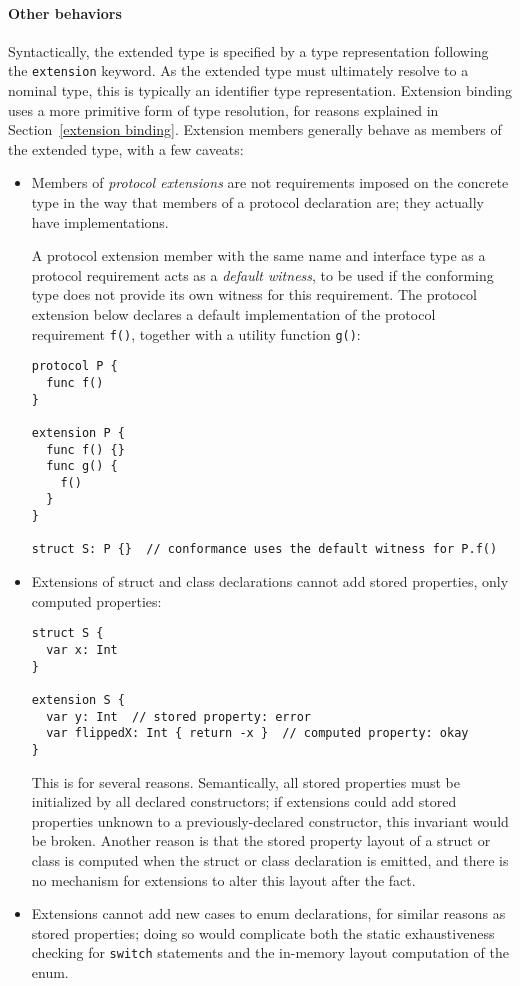 \documentclass[../generics]{subfiles}
\begin{document}
\paragraph{Other behaviors} Syntactically, the extended type is specified by a type representation following the \texttt{extension} keyword. As the extended type must ultimately resolve to a nominal type, this is typically an identifier type representation. Extension binding uses a more primitive form of type resolution, for reasons explained in Section~\ref{extension binding}.  Extension members generally behave as members of the extended type, with a few caveats:
\begin{itemize}
\item Members of \emph{protocol extensions} are not requirements imposed on the concrete type in the way that members of a protocol declaration are; they actually have implementations.

A protocol extension member with the same name and interface type as a protocol requirement acts as a \emph{default witness}, to be used if the conforming type does not provide its own witness for this requirement. The protocol extension below declares a default implementation of the protocol requirement \texttt{f()}, together with a utility function \texttt{g()}:
\begin{Verbatim}
protocol P {
  func f()
}

extension P {
  func f() {}
  func g() {
    f()
  }
}

struct S: P {}  // conformance uses the default witness for P.f()
\end{Verbatim}
\item Extensions of struct and class declarations cannot add stored properties, only computed properties:
\begin{Verbatim}
struct S {
  var x: Int
}

extension S {
  var y: Int  // stored property: error
  var flippedX: Int { return -x }  // computed property: okay
}
\end{Verbatim}
This is for several reasons. Semantically, all stored properties must be initialized by all declared constructors; if extensions could add stored properties unknown to a previously-declared constructor, this invariant would be broken. Another reason is that the stored property layout of a struct or class is computed when the struct or class declaration is emitted, and there is no mechanism for extensions to alter this layout after the fact.
\item Extensions cannot add new cases to enum declarations, for similar reasons as stored properties; doing so would complicate both the static exhaustiveness checking for \texttt{switch} statements and the in-memory layout computation of the enum.


\end{itemize}
\end{document}
